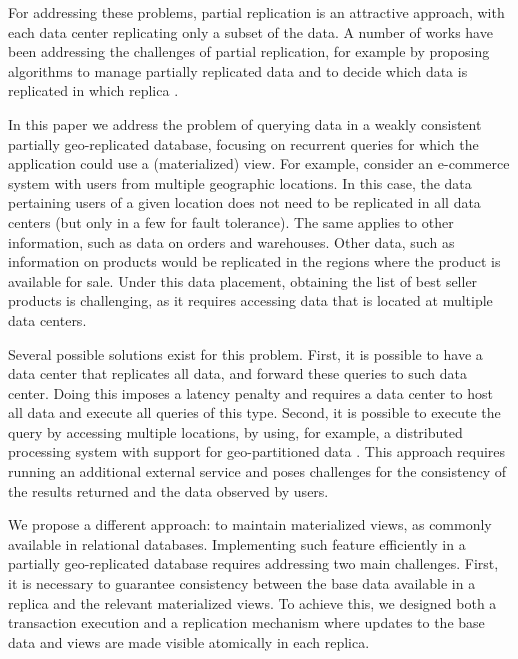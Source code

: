 \documentclass{vldb}
\begin{document}
For addressing these problems, partial replication is an attractive approach, with each data center
replicating only a subset of the data.
A number of works have been addressing the challenges of 
partial replication, for example by proposing algorithms to manage partially replicated data \cite{spanner,saturn,sipre, practi} and to decide which data is replicated in which replica \cite{slog, sipre}.

In this paper we address the problem of querying data in a weakly consistent partially geo-replicated database, 
focusing on recurrent queries for which the application could use a (materialized) view.
For example, consider an e-commerce system with users from multiple geographic locations.
In this case, the data pertaining users of a given location does not need to be replicated in all data centers
(but only in a few for fault tolerance). The same applies to other information, such as data on orders and 
warehouses.
Other data, such as information on products would be replicated in the regions where the product
is available for sale.  
Under this data placement, obtaining the list of best seller products is challenging, as it requires
accessing data that is located at multiple data centers.

Several possible solutions exist for this problem. 
First, it is possible to have a data center that replicates all data, and forward these queries to such data center.
Doing this imposes a latency penalty and requires a data center to host all data and execute all queries of this type. %
Second, it is possible to execute the query by accessing multiple locations, by using, for example, 
a distributed processing system with support for geo-partitioned data \cite{kloudas2015pixida,jetstream}.
This approach requires running an additional external service and poses challenges for the consistency of the results returned and the data observed by users.

We propose a different approach: to maintain materialized views, as commonly available in relational databases.
Implementing such feature efficiently in a partially geo-replicated database requires 
addressing two main challenges. 
First, it is necessary to guarantee consistency between the base data available in a replica and the 
relevant materialized views. To achieve this, we designed both a transaction execution and a replication mechanism where updates 
to the base data and views are made visible atomically in each replica.
\end{document}
